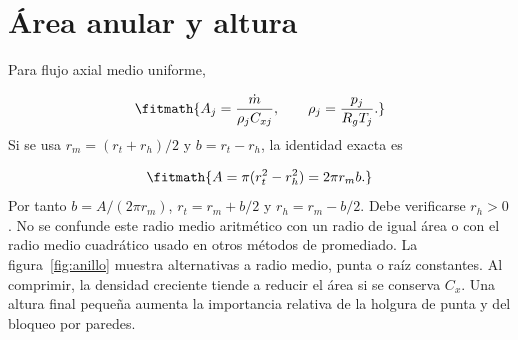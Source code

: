 \documentclass[10pt,openany]{book}
\begin{document}
\section{Área anular y altura}


Para flujo axial medio uniforme,



\[
\fitmath{A_j=\frac{\dot m}{\rho_j C_{xj}},\qquad \rho_j=\frac{p_j}{R_gT_j}.}
\]
Si se usa \(r_m=(r_t+r_h)/2\) y \(b=r_t-r_h\), la identidad exacta es

\[
\fitmath{A=\pi(r_t^2-r_h^2)=2\pi r_m b.}
\]
Por tanto \(b=A/(2\pi r_m)\), \(r_t=r_m+b/2\) y \(r_h=r_m-b/2\). Debe verificarse \(r_h>0\). No se confunde este radio medio aritmético con un radio de igual área o con el radio medio cuadrático usado en otros métodos de promediado.
La figura~\ref{fig:anillo} muestra alternativas a radio medio, punta o raíz constantes. Al comprimir, la densidad creciente tiende a reducir el área si se conserva \(C_x\). Una altura final pequeña aumenta la importancia relativa de la holgura de punta y del bloqueo por paredes.
\end{document}
